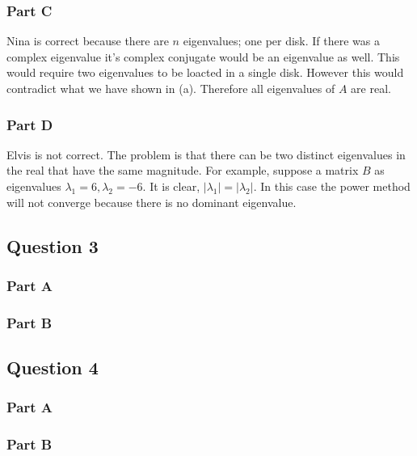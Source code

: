 \subsubsection{Part C}

Nina is correct because there are \(n\) eigenvalues; one per disk.
If there was a complex eigenvalue it's complex conjugate would be an eigenvalue as well.
This would require two eigenvalues to be loacted in a single disk.
However this would contradict what we have shown in (a).
Therefore all eigenvalues of \(A\) are real.

\subsubsection{Part D}

Elvis is not correct.
The problem is that there can be two distinct eigenvalues in the real that have the same magnitude.
For example, suppose a matrix \(B\) as eigenvalues \(\lambda_{1} = 6, \lambda_{2} = -6\).
It is clear, \(|\lambda_{1}| = |\lambda_{2}|\).
In this case the power method will not converge because there is no dominant eigenvalue.

\newpage
\subsection{Question 3}
\subsubsection{Part A}
\subsubsection{Part B}

\newpage
\subsection{Question 4}
\subsubsection{Part A}
\subsubsection{Part B}

%


